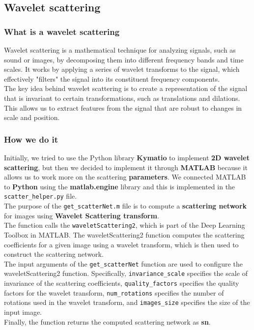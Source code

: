 \documentclass{report}
\begin{document}
\subsection{Wavelet scattering}
\subsubsection{What is a wavelet scattering}
Wavelet scattering is a mathematical technique for analyzing signals, such as sound or images, by decomposing them into different frequency bands and time scales. It works by applying a series of wavelet transforms to the signal, which effectively "filters" the signal into its constituent frequency components.\\
The key idea behind wavelet scattering is to create a representation of the signal that is invariant to certain transformations, such as translations and dilations. This allows us to extract features from the signal that are robust to changes in scale and position.
\subsubsection{How we do it}
Initially, we tried to use the Python library \textbf{Kymatio} to implement \textbf{2D wavelet scattering}, but then we decided to implement it through \textbf{MATLAB} because it allows us to work more on the scattering \textbf{parameters}. We connected MATLAB to \textbf{Python} using the \textbf{matlab.engine} library and this is implemented in the \texttt{scatter\_helper.py} file.\\

The purpose of the \texttt{get\_scatterNet.m} file is to compute a \textbf{scattering network} for images using  \textbf{Wavelet Scattering transform}. 
\\The function calls the \texttt{waveletScattering2}, which is part of the Deep Learning Toolbox in MATLAB. The waveletScattering2 function computes the scattering coefficients for a given image using a wavelet transform, which is then used to construct the scattering network. \\
The input arguments of the \texttt{get\_scatterNet} function are used to configure the waveletScattering2 function. Specifically, \texttt{invariance\_scale} specifies the scale of invariance of the scattering coefficients, \texttt{quality\_factors} specifies the quality factors for the wavelet transform, \texttt{num\_rotations} specifies the number of rotations used in the wavelet transform, and \texttt{images\_size} specifies the size of the input image.\\
Finally, the function returns the computed scattering network as \textbf{sn}.\\
\end{document}
